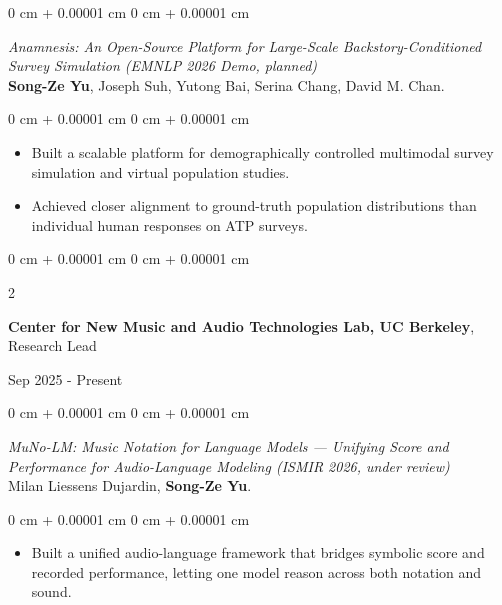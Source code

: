 \documentclass[10pt, letterpaper]{article}
\newenvironment{highlights}{
    \begin{itemize}[
        topsep=0.10 cm,
        parsep=0.10 cm,
        partopsep=0pt,
        itemsep=0pt,
        leftmargin=0 cm + 10pt
    ]
}{
    \end{itemize}
} %
\newenvironment{onecolentry}{
    \begin{adjustwidth}{
        0 cm + 0.00001 cm
    }{
        0 cm + 0.00001 cm
    }
}{
    \end{adjustwidth}
} %
\newenvironment{twocolentry}[2][]{
    \onecolentry
    \def\secondColumn{#2}
    \setcolumnwidth{\fill, 5.2 cm}
    \begin{paracol}{2}
}{
    \switchcolumn \raggedleft \secondColumn
    \end{paracol}
    \endonecolentry
} %
\begin{document}
\vspace{0.15 cm}
\begin{onecolentry}
\textit{Anamnesis: An Open-Source Platform for Large-Scale Backstory-Conditioned Survey Simulation (EMNLP 2026 Demo, planned)}\\
\vspace{0.10 cm}
\textbf{Song-Ze Yu}, Joseph Suh, Yutong Bai, Serina Chang, David M. Chan.
\end{onecolentry}
\vspace{0.10 cm}
\begin{onecolentry}
    \begin{highlights}
        \item Built a scalable platform for demographically controlled multimodal survey simulation and virtual population studies.
        \item Achieved closer alignment to ground-truth population distributions than individual human responses on ATP surveys.
    \end{highlights}
\end{onecolentry}

\vspace{0.20 cm}

\begin{twocolentry}{
    Sep 2025 - Present
}
    \textbf{Center for New Music and Audio Technologies Lab, UC Berkeley}, Research Lead
\end{twocolentry}
\vspace{0.10 cm}
\begin{onecolentry}
\textit{MuNo-LM: Music Notation for Language Models — Unifying Score and Performance for Audio-Language Modeling (ISMIR 2026, under review)}\\
\vspace{0.10 cm}
Milan Liessens Dujardin, \textbf{Song-Ze Yu}.
\end{onecolentry}
\vspace{0.10 cm}
\begin{onecolentry}
    \begin{highlights}
        \item Built a unified audio-language framework that bridges symbolic score and recorded performance, letting one model reason across both notation and sound.
    \end{highlights}
\end{onecolentry}
\end{document}
